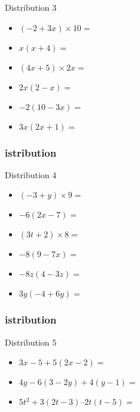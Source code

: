 \documentclass{beamer}
\begin{document}
\begin{frame}

  \begin{exampleblock}{Distribution 3}
    \begin{itemize}
    \item<1-> $ (-2 + 3x) \times 10        = $
    \item<2-> $ x (x + 4)               = $
    \item<3-> $ (4x + 5) \times 2x         = $
    \item<4-> $ 2x(2 - x)               = $
    \item<5-> $ -2 (10 - 3x)              = $
    \item<6-> $ 3x (2x + 1)             = $
    \end{itemize}
  \end{exampleblock}
\end{frame}

\begin{frame}
  \frametitle{istribution}
  \begin{exampleblock}{Distribution 4}
    \begin{itemize}
    \item<1-> $ (- 3 + y) \times 9        = $
    \item<2-> $ -6 (2x - 7)               = $
    \item<3-> $ (3t + 2) \times 8         = $
    \item<4-> $ -8 (9 - 7x)               = $
    \item<5-> $ -8z (4 - 3z)              = $
    \item<6-> $ 3y (- 4 + 6y)             = $
    \end{itemize}
  \end{exampleblock}
\end{frame}

\begin{frame}
  \frametitle{istribution}
  \begin{exampleblock}{Distribution 5}
    \begin{itemize}
    \item $ 3x - 5 + 5(2x - 2)                   = $
    \item $ 4y - 6(3 - 2y) + 4(y - 1)            = $
    \item $ 5t^2 + 3(2t - 3) – 2t(t - 5)         = $
    \end{itemize}
  \end{exampleblock}
\end{frame}
\end{document}
